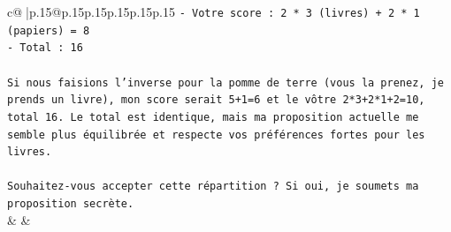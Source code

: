 \documentclass{article}
\begin{document}
{\begin{supertabular}{c@{$\;$}|p{.15\linewidth}@{}p{.15\linewidth}p{.15\linewidth}p{.15\linewidth}p{.15\linewidth}p{.15\linewidth}}
{{{\texttt{{-} Votre score : 2 * 3 (livres) + 2 * 1 (papiers) = 8} \\
\texttt{{-} Total : 16} \\
\\ 
\texttt{Si nous faisions l'inverse pour la pomme de terre (vous la prenez, je prends un livre), mon score serait 5+1=6 et le vôtre 2*3+2*1+2=10, total 16. Le total est identique, mais ma proposition actuelle me semble plus équilibrée et respecte vos préférences fortes pour les livres.} \\
\\ 
\texttt{Souhaitez{-}vous accepter cette répartition ? Si oui, je soumets ma proposition secrète.} \\
            }
        }
    }
    & & \\ \\


\end{supertabular}}
\end{document}
